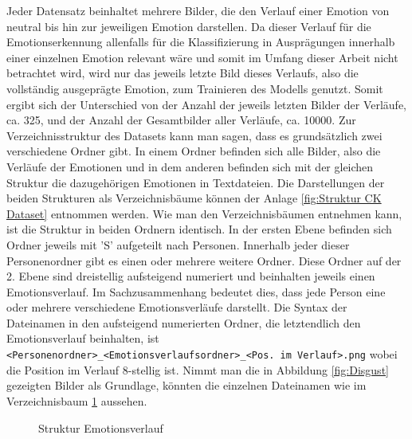 \documentclass[12pt, a4paper]{report}
\begin{document}
Jeder Datensatz beinhaltet mehrere Bilder, die den Verlauf einer Emotion von neutral bis hin zur jeweiligen Emotion darstellen. Da dieser Verlauf für die Emotionserkennung allenfalls für die Klassifizierung in Ausprägungen innerhalb einer einzelnen Emotion relevant wäre und somit im Umfang dieser Arbeit nicht betrachtet wird, wird nur das jeweils letzte Bild dieses Verlaufs, also die vollständig ausgeprägte Emotion, zum Trainieren des Modells genutzt. Somit ergibt sich der Unterschied von der Anzahl der jeweils letzten Bilder der Verläufe, ca. 325, und der Anzahl der Gesamtbilder aller Verläufe, ca. 10000.
Zur Verzeichnisstruktur des Datasets kann man sagen, dass es grundsätzlich zwei verschiedene Ordner gibt. In einem Ordner befinden sich alle Bilder, also die Verläufe der Emotionen und in dem anderen befinden sich mit der gleichen Struktur die dazugehörigen Emotionen in Textdateien. Die Darstellungen der beiden Strukturen als Verzeichnisbäume können der Anlage \ref{fig:Struktur CK Dataset} entnommen werden. Wie man den Verzeichnisbäumen entnehmen kann, ist die Struktur in beiden Ordnern identisch. In der ersten Ebene befinden sich Ordner jeweils mit 'S' aufgeteilt nach Personen. Innerhalb jeder dieser Personenordner gibt es einen oder mehrere weitere Ordner. Diese Ordner auf der 2. Ebene sind dreistellig aufsteigend numeriert und beinhalten jeweils einen Emotionsverlauf. Im Sachzusammenhang bedeutet dies, dass jede Person eine oder mehrere verschiedene Emotionsverläufe darstellt. Die Syntax der Dateinamen in den aufsteigend numerierten Ordner, die letztendlich den Emotionsverlauf beinhalten, ist \texttt{<Personenordner>\_<Emotionsverlaufsordner>\_<Pos. im Verlauf>.png} wobei die Position im Verlauf 8-stellig ist. Nimmt man die in Abbildung \ref{fig:Disgust} gezeigten Bilder als Grundlage, könnten die einzelnen Dateinamen wie im Verzeichnisbaum \ref{fig:Tree Emotionsverlauf} aussehen.
\begin{figure}
\caption{Struktur Emotionsverlauf}
\label{fig:Tree Emotionsverlauf}
\end{figure}
\end{document}
